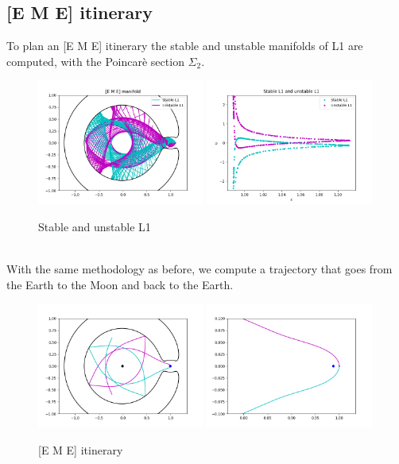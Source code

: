 \documentclass{report}
\begin{document}
\subsection*{[E M E] itinerary}
To plan an [E M E] itinerary the stable and unstable manifolds of L1 are computed, with the Poincarè section $\Sigma_2$.
\begin{figure}[h]
    \centering
    \includegraphics[width=0.49\textwidth]{images/manifold_EME.png}
    \includegraphics[width=0.49\textwidth]{images/EME_xu.png}
    \caption{Stable and unstable L1}
\end{figure}\\
With the same methodology as before, we compute a trajectory that goes from the Earth to the Moon and back to the Earth.
\begin{figure}[h]
    \centering
    \includegraphics[width=0.49\textwidth]{images/EME_traj.png}
    \includegraphics[width=0.49\textwidth]{images/EME_traj_z.png}
    \caption{[E M E] itinerary}
\end{figure}
\newpage
\end{document}
